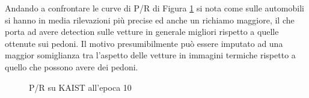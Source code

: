 Andando a confrontare le curve di P/R di Figura \ref{fig:test_kaist_ep8} si nota come sulle automobili si hanno in media rilevazioni più precise ed anche un richiamo maggiore, il che porta ad avere detection sulle vetture in generale migliori rispetto a quelle ottenute sui pedoni. Il motivo presumibilmente può essere imputato ad una maggior somiglianza tra l'aspetto delle vetture in immagini termiche rispetto a quello che possono avere dei pedoni.  
\begin{figure}
    \begin{minipage}{.5\linewidth}
        \centering
    \end{minipage}%
    \begin{minipage}{.5\linewidth}
        \centering
    \end{minipage}
    \centering
    \caption{P/R su KAIST all'epoca 10}
    \label{fig:test_kaist_ep8}
\end{figure}



